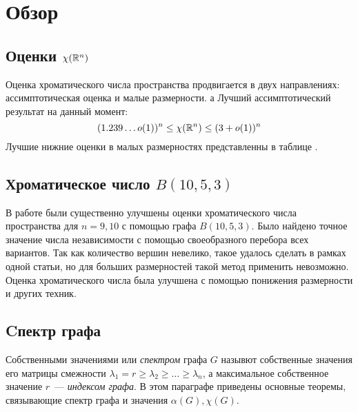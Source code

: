 \section{Обзор}
\subsection{Оценки $\chi(\mathbb R^n)$}
Оценка хроматического числа пространства продвигается в двух направлениях:
ассимптотическая оценка и малые размерности.
а
Лучший ассимптотический результат на данный момент:
\begin{equation}
    (1.239\dots o(1))^n \leq \chi(\mathbb R^n) \leq (3+ o(1))^n
\end{equation}
Лучшие нижние оценки в малых размерностях представленны в таблице
.



\subsection{Хроматическое число $B(10,5,3)$}
В работе  были существенно улучшены оценки хроматического числа
пространства для $n=9,10$ с помощью графа $B(10,5,3)$. Было найдено точное
значение числа независимости с помощью своеобразного перебора всех вариантов.
Так как количество вершин невелико, такое удалось сделать в рамках одной
статьи, но для больших размерностей такой метод применить
невозможно. Оценка хроматического числа была улучшена с помощью понижения
размерности и других техник. 
\subsection{Cпектр графа}
Собственными значениями или \emph{спектром} графа $G$ назывют собственные
значения его матрицы смежности
$\lambda_1=r \geq \lambda_2 \geq \dots \geq \lambda_n$, 
а максимальное собственное значение $r$~--- \emph{индексом графа}.
В этом параграфе приведены основные теоремы,
связывающие спектр графа и значения $\alpha(G), \chi(G)$.

